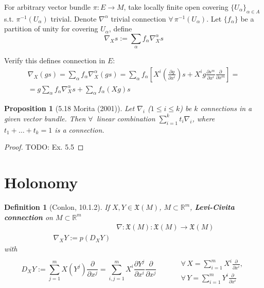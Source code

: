\documentclass[10pt]{amsart}
\newtheorem{proposition}{Proposition}
\newtheorem{definition}{Definition}
\begin{document}
\begin{multicols*}{2}
For arbitrary vector bundle $\pi : E \to M$, take locally finite open covering $\lbrace U_{\alpha} \rbrace_{\alpha \in A}$ s.t. $\pi^{-1}(U_{\alpha})$ trivial. Denote $\nabla^{\alpha} $ trivial connection $\forall \, \pi^{-1}(U_{\alpha})$. Let $\lbrace f_{\alpha} \rbrace$ be a partition of unity for covering $U_{\alpha}$, define 
	\[
	\nabla_X s := \sum_{\alpha} f_{\alpha} \nabla_X^{\alpha} s
	\]

Verify this defines connection in $E$:
\[
\begin{gathered}
\nabla_X(gs) = \sum_{\alpha} f_{\alpha} \nabla^{\alpha}_X(gs) = \sum_{\alpha} f_{\alpha} \left[ X^i \left( \frac{\partial g}{\partial x^i} \right) s + X^i g \frac{\partial s^m}{\partial x^i} \frac{\partial}{\partial x^m} \right] = \\
= g \sum_{\alpha} f_{\alpha} \nabla_X^{\alpha} s + \sum_{\alpha} f_{\alpha} (Xg) s
\end{gathered}
\]

\begin{proposition}[5.18 Morita (2001)\cite{Mori2001}]
Let $\nabla_i$ ($1 \leq i \leq k$) be $k$ connections in a given vector bundle. Then $\forall \, $ linear combination $\sum_{i=1}^k t_i \nabla_i$, where $t_1 + \dots + t_k =1$ is a connection.	
\end{proposition} 

\begin{proof}
	TODO: Ex. 5.5
\end{proof} 


\part{Holonomy}

\begin{definition}[Conlon, 10.1.2] If $X,Y\in \mathfrak{X}(M)$, $M\subset \mathbb{R}^m$, \textbf{Levi-Civita connection} on $M\subset \mathbb{R}^m$
	\begin{equation}
	\begin{aligned}
	& \nabla : \mathfrak{X}(M) : \mathfrak{X}(M) \to \mathfrak{X}(M) \\
	\nabla_XY := p(D_XY)
	\end{aligned}
	\end{equation}
	with 
	\[
	D_XY := \sum_{j=1}^m X(Y^j) \frac{ \partial }{ \partial x^j} = \sum_{i,j=1}^m X^i \frac{ \partial Y^j}{ \partial x^i} \frac{ \partial }{ \partial x^j} \qquad \,  \begin{aligned} & \quad \\ 
		& \forall \, X=\sum_{i=1}^m X^i \frac{ \partial }{ \partial x^i},  \\
		& \forall \, Y=\sum_{i=1}^m Y^i \frac{\partial }{ \partial x^i } \end{aligned}
	\]
\end{definition}


\end{multicols*}
\end{document}
